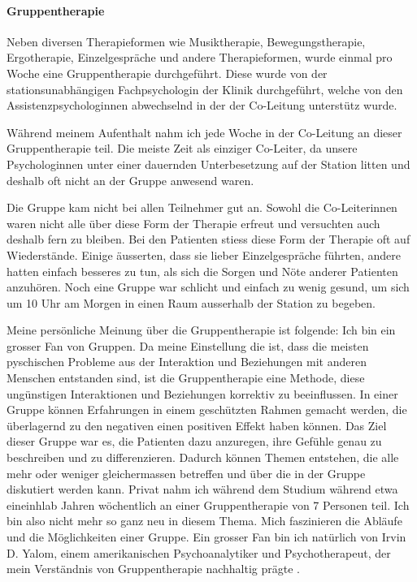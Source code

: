 \paragraph{Gruppentherapie}
Neben diversen Therapieformen wie Musiktherapie, Bewegungstherapie, Ergotherapie, Einzelgespräche und andere Therapieformen, wurde einmal pro Woche eine Gruppentherapie durchgeführt. Diese wurde von der stationsunabhängigen Fachpsychologin der Klinik durchgeführt, welche von den Assistenzpsychologinnen abwechselnd in der der Co-Leitung unterstütz wurde. 

Während meinem Aufenthalt nahm ich jede Woche in der Co-Leitung an dieser Gruppentherapie teil. Die meiste Zeit als einziger Co-Leiter, da unsere Psychologinnen unter einer dauernden Unterbesetzung auf der Station litten und deshalb oft nicht an der Gruppe anwesend waren. 

Die Gruppe kam nicht bei allen Teilnehmer gut an. Sowohl die Co-Leiterinnen waren nicht alle über diese Form der Therapie erfreut und versuchten auch deshalb fern zu bleiben. Bei den Patienten stiess diese Form der Therapie oft auf Wiederstände. Einige äusserten, dass sie lieber Einzelgespräche führten, andere hatten einfach besseres zu tun, als sich die Sorgen und Nöte anderer Patienten anzuhören. Noch eine Gruppe war schlicht und einfach zu wenig gesund, um sich um 10 Uhr am Morgen in einen Raum ausserhalb der Station zu begeben.

Meine persönliche Meinung über die Gruppentherapie ist folgende: Ich bin ein grosser Fan von Gruppen. Da meine Einstellung die ist, dass die meisten pyschischen Probleme aus der Interaktion und Beziehungen mit anderen Menschen entstanden sind, ist die Gruppentherapie eine Methode, diese ungünstigen Interaktionen und Beziehungen korrektiv zu beeinflussen. In einer Gruppe können Erfahrungen in einem geschützten Rahmen gemacht werden, die überlagernd zu den negativen einen positiven Effekt haben können. Das Ziel dieser Gruppe war es, die Patienten dazu anzuregen, ihre Gefühle genau zu beschreiben und zu differenzieren. Dadurch können Themen entstehen, die alle mehr oder weniger gleichermassen betreffen und über die in der Gruppe diskutiert werden kann. Privat nahm ich während dem Studium während etwa eineinhlab Jahren wöchentlich an einer Gruppentherapie von 7 Personen teil. Ich bin also nicht mehr so ganz neu in diesem Thema. Mich faszinieren die Abläufe und die Möglichkeiten einer Gruppe. Ein grosser Fan bin ich natürlich von Irvin D. Yalom, einem amerikanischen Psychoanalytiker und Psychotherapeut, der mein Verständnis von Gruppentherapie nachhaltig prägte \cite{Yalom2010}.


